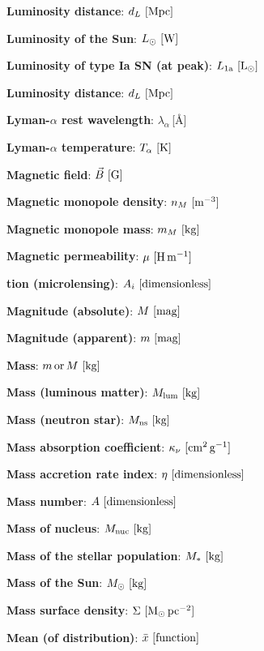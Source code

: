 \documentclass[a4paper,10pt]{article}
\begin{document}
{\noindent}\textbf{Luminosity distance}: $d_L ~ [{\rm Mpc}]$

{\noindent}\textbf{Luminosity of the Sun}: $L_\odot ~ [{\rm W}]$

{\noindent}\textbf{Luminosity of type Ia SN (at peak)}: $L_\mathrm{1a} ~ [{\rm L_\odot}]$

{\noindent}\textbf{Luminosity distance}: $d_L ~ [{\rm Mpc}]$

{\noindent}\textbf{Lyman-$\alpha$ rest wavelength}: $\lambda_\alpha$\,[\AA]

{\noindent}\textbf{Lyman-$\alpha$ temperature}: $T_\alpha ~ [{\rm K}]$

{\noindent}\textbf{Magnetic field}: $\vec{B} ~ [{\rm G}]$

{\noindent}\textbf{Magnetic monopole density}: $n_M ~ [{\rm m^{-3}}]$

{\noindent}\textbf{Magnetic monopole mass}: $m_M ~ [{\rm kg}]$

{\noindent}\textbf{Magnetic permeability}: $\mu ~ [{\rm H\,m^{-1}}]$

{\noindent}\textbf{tion (microlensing)}: $A_i ~ [{\rm dimensionless}]$

{\noindent}\textbf{Magnitude (absolute)}: $M ~ [{\rm mag}]$

{\noindent}\textbf{Magnitude (apparent)}: $m ~ [{\rm mag}]$

{\noindent}\textbf{Mass}: $m\,{\rm or}\,M ~ [{\rm kg}]$

{\noindent}\textbf{Mass (luminous matter)}: $M_{\rm lum} ~ [{\rm kg}]$

{\noindent}\textbf{Mass (neutron star)}: $M_{\rm ns} ~ [{\rm kg}]$

{\noindent}\textbf{Mass absorption coefficient}: $\kappa_\nu ~ [{\rm cm^2\,g^{-1}}]$

{\noindent}\textbf{Mass accretion rate index}: $\eta ~ [{\rm dimensionless}]$

{\noindent}\textbf{Mass number}: $A ~ [{\rm dimensionless}]$

{\noindent}\textbf{Mass of nucleus}: $M_{\rm nuc} ~ [{\rm kg}]$

{\noindent}\textbf{Mass of the stellar population}: $M_* ~ [{\rm kg}]$

{\noindent}\textbf{Mass of the Sun}: $M_\odot ~ [{\rm kg}]$

{\noindent}\textbf{Mass surface density}: $\Sigma ~ [{\rm M_\odot\,pc^{-2}}]$

{\noindent}\textbf{Mean (of distribution)}: $\bar{x} ~ [{\rm function}]$
\end{document}
